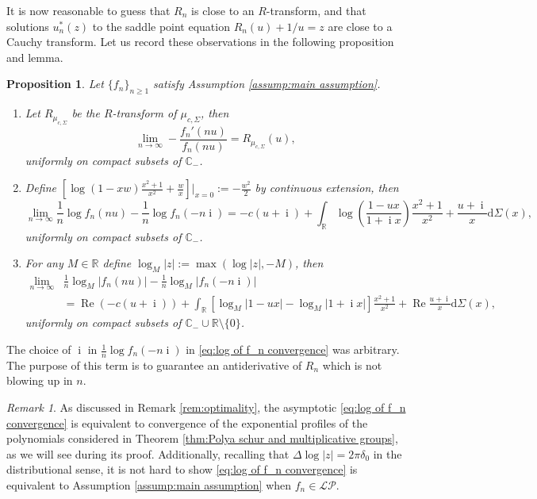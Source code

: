 \documentclass[reqno]{amsart}
\newcommand{\1}{\mathbf{1}}
\newcommand{\dd}{\mathrm{d}}
\DeclareMathOperator{\ii}{i}
\newcommand{\C}{\mathbb{C}}
\renewcommand\Re{\operatorname{Re}}
\newcommand{\R}{\mathbb{R}}
\def\R{\mathbb{R}}
\newcommand{\LP}{\mathcal{LP}}
\theoremstyle{plain}
\newtheorem{proposition}[theorem]{Proposition}
\theoremstyle{definition}
\theoremstyle{remark}
\newtheorem{remark}[theorem]{Remark}
\numberwithin{equation}{section}
\begin{document}
It is now reasonable to guess that $R_n$ is close to an $R$-transform, and that solutions $u_n^*(z)$ to the saddle point equation $R_n(u)+1/u=z$ are close to a Cauchy transform. Let us record these observations in the following proposition and lemma. 
 \begin{proposition}\label{prop:convergence of R-transforms}
	Let $\{f_{n}\}_{n\geq 1}$ satisfy Assumption \ref{assump:main assumption}. 
	\begin{enumerate}
		\item Let $R_{\mu_{c,\Sigma}}$ be the $R$-transform of $\mu_{c,\Sigma}$, then 
		\begin{equation}
			\lim\limits_{n\rightarrow\infty}-\frac{f_{n}'(nu)}{f_{n}(nu)}= R_{\mu_{c,\Sigma}}(u),
		\end{equation} 
		uniformly on compact subsets of $\C_{-}$.
		
		\item Define $\left[ \log(1-xw)\frac{x^2+1}{x^2}+\frac{w}{x}\right]\Big|_{x=0}:=-\frac{w^2}{2}$ by continuous extension, then		
		\begin{equation}\label{eq:log of f_n convergence}
			\lim\limits_{n\rightarrow\infty}\frac{1}{n}\log f_{n}(nu)-\frac{1}{n}\log f_{n}(-n\ii)=-c(u+\ii)+\int_{\R}\log\left(\frac{1-ux}{1+\ii x}\right)\frac{x^2+1}{x^2}+\frac{u+\ii}{x}\dd\Sigma(x),
		\end{equation}  uniformly on compact subsets of $\C_{-}$.
		\item For any $M\in\R$ define $\log_{M}|z|:=\max(\log|z|,-M)$, then \begin{align}\label{eq:cutoff log of f_n convergence}
			\lim\limits_{n\rightarrow\infty} &\frac{1}{n}\log_{M}| f_{n}(nu)|-\frac{1}{n}\log_{M}| f_{n}(-n\ii)|\\
			&=\Re\left(-c(u+\ii)\right)+\int_{\R}\left[\log_{M}\left|{1-ux}\right|-\log_{M}\left|{1+\ii x}\right|\right]\frac{x^2+1}{x^2} +\Re\frac{u+\ii}{x}\dd\Sigma(x),\nonumber
		\end{align} uniformly on compact subsets of $\C_{-}\cup\R\setminus\{0\}$.
	\end{enumerate} 
\end{proposition} 

The choice of $\ii$ in $\frac{1}{n}\log f_{n}(-n\ii)$ in \eqref{eq:log of f_n convergence} was arbitrary. The purpose of this term is to guarantee an antiderivative of $R_n$ which is not blowing up in $n$. 
\begin{remark}
	 As discussed in Remark \ref{rem:optimality}, the asymptotic \eqref{eq:log of f_n convergence} is equivalent to convergence of the exponential profiles of the polynomials considered in Theorem \ref{thm:Polya schur and multiplicative groups}, as we will see during its proof. Additionally, recalling that $\Delta \log|z|=2\pi\delta_{0}$ in the distributional sense, it is not hard to show \eqref{eq:log of f_n convergence} is equivalent to Assumption \ref{assump:main assumption} when $f_{n}\in\LP$.
\end{remark}
\end{document}
